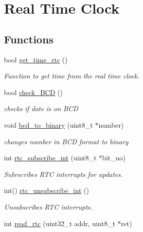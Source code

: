 \hypertarget{group__RealTimeClock}{}\section{Real Time Clock}
\label{group__RealTimeClock}
\subsection*{Functions}
\begin{DoxyCompactItemize}
\item 
bool \hyperlink{group__RealTimeClock_ga18fb6b60ca3519b4c5943902893f89eb}{get\+\_\+time\+\_\+rtc} ()
\begin{DoxyCompactList}\small\item\em Function to get time from the real time clock. \end{DoxyCompactList}\item 
bool \hyperlink{group__RealTimeClock_gab79ee864e66f8b74b5d0120a57a2c4f7}{check\+\_\+\+B\+CD} ()
\begin{DoxyCompactList}\small\item\em checks if date is on B\+CD \end{DoxyCompactList}\item 
void \hyperlink{group__RealTimeClock_ga3712be4b01789095104f73d8a0488e10}{bcd\+\_\+to\+\_\+binary} (uint8\+\_\+t $\ast$number)
\begin{DoxyCompactList}\small\item\em changes number in B\+CD format to binary \end{DoxyCompactList}\item 
int \hyperlink{group__RealTimeClock_ga5171a9c0f54940fe60f7500896afcc86}{rtc\+\_\+subscribe\+\_\+int} (uint8\+\_\+t $\ast$bit\+\_\+no)
\begin{DoxyCompactList}\small\item\em Subrscribes R\+TC interrupts for updates. \end{DoxyCompactList}\item 
int() \hyperlink{group__RealTimeClock_ga9d4850bb2a488644672d43287f160622}{rtc\+\_\+unsubscribe\+\_\+int} ()
\begin{DoxyCompactList}\small\item\em Unsubscribes R\+TC interrupts. \end{DoxyCompactList}\item 
int \hyperlink{group__RealTimeClock_gae37f65cb1eda30db92728dc94bb52b76}{read\+\_\+rtc} (uint32\+\_\+t addr, uint8\+\_\+t $\ast$ret)

\end{DoxyCompactItemize}
